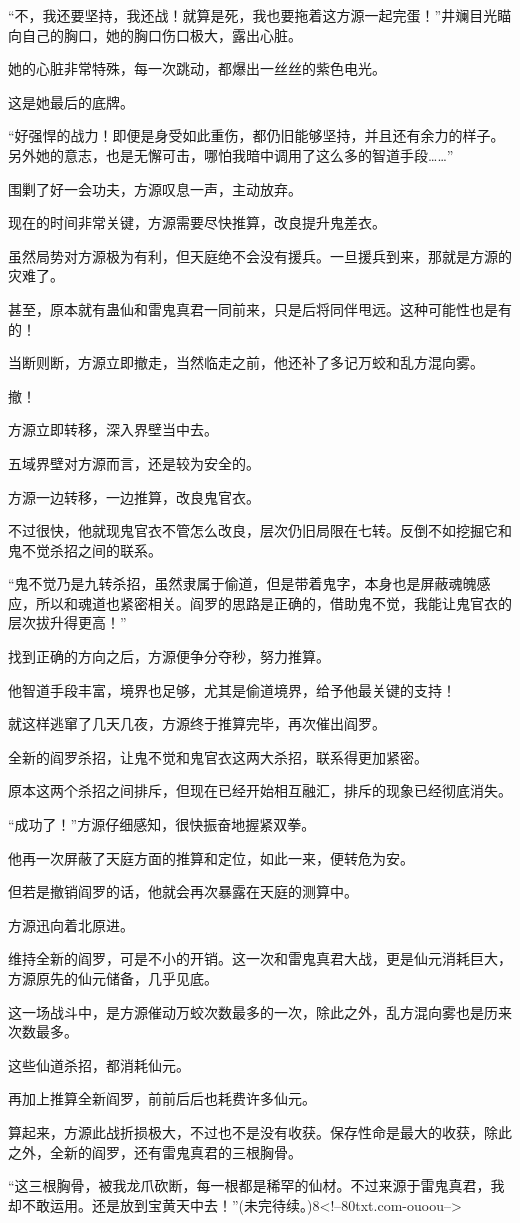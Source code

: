 \begin{this_body}
“不，我还要坚持，我还战！就算是死，我也要拖着这方源一起完蛋！”井斓目光瞄向自己的胸口，她的胸口伤口极大，露出心脏。

她的心脏非常特殊，每一次跳动，都爆出一丝丝的紫色电光。

这是她最后的底牌。

“好强悍的战力！即便是身受如此重伤，都仍旧能够坚持，并且还有余力的样子。另外她的意志，也是无懈可击，哪怕我暗中调用了这么多的智道手段……”

围剿了好一会功夫，方源叹息一声，主动放弃。

现在的时间非常关键，方源需要尽快推算，改良提升鬼差衣。

虽然局势对方源极为有利，但天庭绝不会没有援兵。一旦援兵到来，那就是方源的灾难了。

甚至，原本就有蛊仙和雷鬼真君一同前来，只是后将同伴甩远。这种可能性也是有的！

当断则断，方源立即撤走，当然临走之前，他还补了多记万蛟和乱方混向雾。

撤！

方源立即转移，深入界壁当中去。

五域界壁对方源而言，还是较为安全的。

方源一边转移，一边推算，改良鬼官衣。

不过很快，他就现鬼官衣不管怎么改良，层次仍旧局限在七转。反倒不如挖掘它和鬼不觉杀招之间的联系。

“鬼不觉乃是九转杀招，虽然隶属于偷道，但是带着鬼字，本身也是屏蔽魂魄感应，所以和魂道也紧密相关。阎罗的思路是正确的，借助鬼不觉，我能让鬼官衣的层次拔升得更高！”

找到正确的方向之后，方源便争分夺秒，努力推算。

他智道手段丰富，境界也足够，尤其是偷道境界，给予他最关键的支持！

就这样逃窜了几天几夜，方源终于推算完毕，再次催出阎罗。

全新的阎罗杀招，让鬼不觉和鬼官衣这两大杀招，联系得更加紧密。

原本这两个杀招之间排斥，但现在已经开始相互融汇，排斥的现象已经彻底消失。

“成功了！”方源仔细感知，很快振奋地握紧双拳。

他再一次屏蔽了天庭方面的推算和定位，如此一来，便转危为安。

但若是撤销阎罗的话，他就会再次暴露在天庭的测算中。

方源迅向着北原进。

维持全新的阎罗，可是不小的开销。这一次和雷鬼真君大战，更是仙元消耗巨大，方源原先的仙元储备，几乎见底。

这一场战斗中，是方源催动万蛟次数最多的一次，除此之外，乱方混向雾也是历来次数最多。

这些仙道杀招，都消耗仙元。

再加上推算全新阎罗，前前后后也耗费许多仙元。

算起来，方源此战折损极大，不过也不是没有收获。保存性命是最大的收获，除此之外，全新的阎罗，还有雷鬼真君的三根胸骨。

“这三根胸骨，被我龙爪砍断，每一根都是稀罕的仙材。不过来源于雷鬼真君，我却不敢运用。还是放到宝黄天中去！”(未完待续。)8<!--80txt.com-ouoou-->

\end{this_body}

